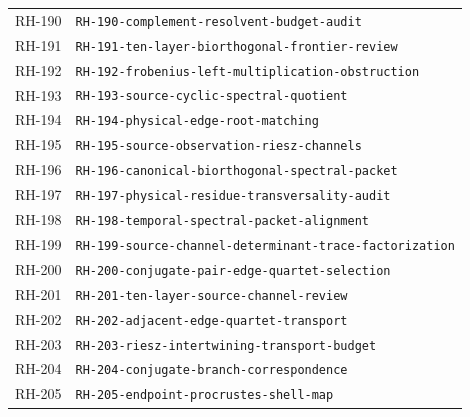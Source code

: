 \begin{longtable}{r >{\raggedright\arraybackslash}p{}}
RH-190 & \texttt{RH-\allowbreak{}190-\allowbreak{}complement-\allowbreak{}resolvent-\allowbreak{}budget-\allowbreak{}audit}\\
RH-191 & \texttt{RH-\allowbreak{}191-\allowbreak{}ten-\allowbreak{}layer-\allowbreak{}biorthogonal-\allowbreak{}frontier-\allowbreak{}review}\\
RH-192 & \texttt{RH-\allowbreak{}192-\allowbreak{}frobenius-\allowbreak{}left-\allowbreak{}multiplication-\allowbreak{}obstruction}\\
RH-193 & \texttt{RH-\allowbreak{}193-\allowbreak{}source-\allowbreak{}cyclic-\allowbreak{}spectral-\allowbreak{}quotient}\\
RH-194 & \texttt{RH-\allowbreak{}194-\allowbreak{}physical-\allowbreak{}edge-\allowbreak{}root-\allowbreak{}matching}\\
RH-195 & \texttt{RH-\allowbreak{}195-\allowbreak{}source-\allowbreak{}observation-\allowbreak{}riesz-\allowbreak{}channels}\\
RH-196 & \texttt{RH-\allowbreak{}196-\allowbreak{}canonical-\allowbreak{}biorthogonal-\allowbreak{}spectral-\allowbreak{}packet}\\
RH-197 & \texttt{RH-\allowbreak{}197-\allowbreak{}physical-\allowbreak{}residue-\allowbreak{}transversality-\allowbreak{}audit}\\
RH-198 & \texttt{RH-\allowbreak{}198-\allowbreak{}temporal-\allowbreak{}spectral-\allowbreak{}packet-\allowbreak{}alignment}\\
RH-199 & \texttt{RH-\allowbreak{}199-\allowbreak{}source-\allowbreak{}channel-\allowbreak{}determinant-\allowbreak{}trace-\allowbreak{}factorization}\\
RH-200 & \texttt{RH-\allowbreak{}200-\allowbreak{}conjugate-\allowbreak{}pair-\allowbreak{}edge-\allowbreak{}quartet-\allowbreak{}selection}\\
RH-201 & \texttt{RH-\allowbreak{}201-\allowbreak{}ten-\allowbreak{}layer-\allowbreak{}source-\allowbreak{}channel-\allowbreak{}review}\\
RH-202 & \texttt{RH-\allowbreak{}202-\allowbreak{}adjacent-\allowbreak{}edge-\allowbreak{}quartet-\allowbreak{}transport}\\
RH-203 & \texttt{RH-\allowbreak{}203-\allowbreak{}riesz-\allowbreak{}intertwining-\allowbreak{}transport-\allowbreak{}budget}\\
RH-204 & \texttt{RH-\allowbreak{}204-\allowbreak{}conjugate-\allowbreak{}branch-\allowbreak{}correspondence}\\
RH-205 & \texttt{RH-\allowbreak{}205-\allowbreak{}endpoint-\allowbreak{}procrustes-\allowbreak{}shell-\allowbreak{}map}\\

\end{longtable}
